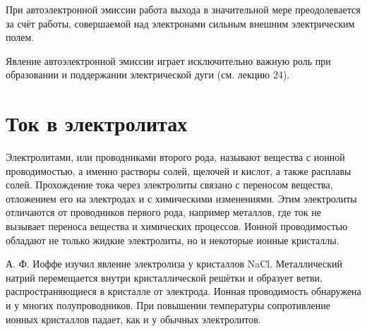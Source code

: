 \documentclass[a4paper,10pt]{book}
\begin{document}
При автоэлектронной эмиссии работа выхода в значительной мере преодолевается за счёт работы, совершаемой над электронами сильным внешним электрическим полем.

Явление автоэлектронной эмиссии играет исключительно важную роль при образовании и поддержании электрической дуги (см. лекцию 24).

\chapter{Ток в электролитах}

Электролитами, или проводниками второго рода, называют вещества с ионной проводимостью, а именно растворы солей, щелочей и кислот, а также расплавы солей. Прохождение тока через электролиты связано с переносом вещества, отложением его на электродах и с химическими изменениями. Этим электролиты отличаются от проводников первого рода, например металлов, где ток не вызывает переноса вещества и химических процессов. Ионной проводимостью обладают не только жидкие электролиты, но и некоторые ионные кристаллы.

А. Ф. Иоффе изучил явление электролиза у кристаллов NaCl. Металлический натрий перемещается внутри кристаллической решётки и образует ветви, распространяющиеся в кристалле от электрода. Ионная проводимость обнаружена и у многих полупроводников. При повышении температуры сопротивление ионных кристаллов падает, как и у обычных электролитов.

\begin{figure}[h]
	\caption{}
	\label{pic50}
\end{figure}
\end{document}
